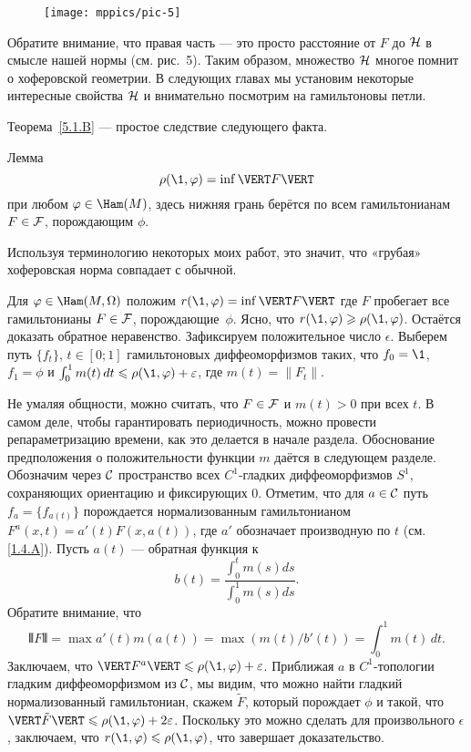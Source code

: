 \begin{figure}[ht!]
\vskip0mm
\centering
\texttt{[image: mppics/pic-5]}
\caption{}\label{pic-5}
\vskip0mm
\end{figure}

Обратите внимание, что правая часть — это просто расстояние от $F$ до $\mathcal{H}$ в смысле нашей нормы (см. рис.~5).
Таким образом, множество $\mathcal{H}$ многое помнит о хоферовской геометрии.
В следующих главах мы установим некоторые интересные свойства $\mathcal{H}$ и внимательно посмотрим на гамильтоновы петли.

Теорема~\ref{5.1.B} — простое следствие следующего факта.

\begin{thm}{Лемма}\label{5.1.C}
\[\rho (\1, \phi) = \inf \VERT F \VERT\]
при любом $\phi \in \Ham (M)$, здесь нижняя грань берётся по всем гамильтонианам $F\in\mathcal{F}$, порождающим $\phi$.
\end{thm}

Используя терминологию некоторых моих работ, это значит, что «грубая» хоферовская норма совпадает с обычной.

Для $\phi \in \Ham (M, \Omega)$ положим $r (\1, \phi) \z= \inf \VERT F
\VERT$ где $F$ пробегает все гамильтонианы $F \in \mathcal{F}$,
порождающие~$\phi$. 
Ясно, что $r (\1, \phi) \ge \rho (\1, \phi)$.
Остаётся доказать обратное неравенство. 
Зафиксируем положительное число $\epsilon$.
Выберем путь $\{f_t\}$, $t \in [0; 1]$ гамильтоновых диффеоморфизмов
таких, что $f_0 = \1$, $f_1 = \phi$ и  $\int_0^1 m (t)\,dt \le \rho
(\1, \phi) + \epsilon$, где $m (t) = \| F_t \|$.

Не умаляя общности, можно считать, что $F \in \mathcal{F}$ и $m (t)> 0$ при всех $t$.
В самом деле, чтобы гарантировать периодичность, можно провести
репараметризацию времени, как это
делается в начале раздела. 
Обоснование
предположения о положительности функции $m$
даётся в следующем разделе.
Обозначим через $\mathcal{C}$ пространство всех $C^1$-гладких диффеоморфизмов
$S^1$, сохраняющих ориентацию и фиксирующих $0$. 
Отметим, что для $a \in \mathcal{C}$ путь $f_a = \{f_{a(t)}\}$ порождается
нормализованным гамильтонианом $F^a (x, t) = a' (t) F (x, a(t))$, где
$a'$ обозначает производную по $t$ (см. \ref{1.4.A}). 
Пусть $a(t)$ --- обратная функция к 
\[b(t)
=
\frac{\int_0^t m(s)ds}{\int_0^1 m(s)ds}.\]
Обратите внимание, что 
\[\VERT F \VERT = \max a' (t) m (a (t)) = \max (m (t) / b'(t)) = \int_0^1m (t)\,dt.\]
Заключаем, что $\VERT F^a \VERT \le \rho (\1, \phi) + \epsilon$.
Приближая $a$ в $C^1$-топологии гладким диффеоморфизмом из $\mathcal{C}$, мы видим, что можно найти гладкий нормализованный гамильтониан, скажем $\tilde F$, который порождает $\phi$ и такой, что $\VERT \tilde F \VERT \le \rho (\1, \phi) + 2\epsilon$.
Поскольку это можно сделать для произвольного $\epsilon$, заключаем, что $r (\1, \phi) \le \rho (\1, \phi)$, что завершает доказательство.
\qeds

